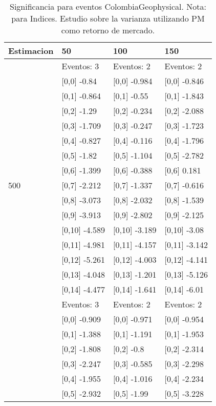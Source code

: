 \begin{table}

\caption{Significancia para eventos ColombiaGeophysical. Nota: para Indices. Estudio sobre la varianza utilizando PM como retorno de mercado.}
\centering
\begin{tabular}[t]{llll}
\toprule
Estimacion & 50 & 100 & 150\\
\midrule
 & Eventos:  3 & Eventos:  2 & Eventos:  2\\
 & {}[0,0] -0.84 & {}[0,0] -0.984 & {}[0,0] -0.846\\
 & {}[0,1] -0.864 & {}[0,1] -0.55 & {}[0,1] -1.843\\
 & {}[0,2] -1.29 & {}[0,2] -0.234 & {}[0,2] -2.088\\
 & {}[0,3] -1.709 & {}[0,3] -0.247 & {}[0,3] -1.723\\
\addlinespace
 & {}[0,4] -0.827 & {}[0,4] -0.116 & {}[0,4] -1.796\\
 & {}[0,5] -1.82 & {}[0,5] -1.104 & {}[0,5] -2.782\\
 & {}[0,6] -1.399 & {}[0,6] -0.388 & {}[0,6] 0.181\\
500 & {}[0,7] -2.212 & {}[0,7] -1.337 & {}[0,7] -0.616\\
 & {}[0,8] -3.073 & {}[0,8] -2.032 & {}[0,8] -1.539\\
\addlinespace
 & {}[0,9] -3.913 & {}[0,9] -2.802 & {}[0,9] -2.125\\
 & {}[0,10] -4.589 & {}[0,10] -3.189 & {}[0,10] -3.08\\
 & {}[0,11] -4.981 & {}[0,11] -4.157 & {}[0,11] -3.142\\
 & {}[0,12] -5.261 & {}[0,12] -4.003 & {}[0,12] -4.141\\
 & {}[0,13] -4.048 & {}[0,13] -1.201 & {}[0,13] -5.126\\
\addlinespace
 & {}[0,14] -4.477 & {}[0,14] -1.641 & {}[0,14] -6.01\\
 & Eventos:  3 & Eventos:  2 & Eventos:  2\\
 & {}[0,0] -0.909 & {}[0,0] -0.971 & {}[0,0] -0.954\\
 & {}[0,1] -1.388 & {}[0,1] -1.191 & {}[0,1] -1.953\\
 & {}[0,2] -1.808 & {}[0,2] -0.8 & {}[0,2] -2.314\\
\addlinespace
 & {}[0,3] -2.247 & {}[0,3] -0.585 & {}[0,3] -2.298\\
 & {}[0,4] -1.955 & {}[0,4] -1.016 & {}[0,4] -2.234\\
 & {}[0,5] -2.932 & {}[0,5] -1.99 & {}[0,5] -3.228\\

\end{tabular}
\end{table}
